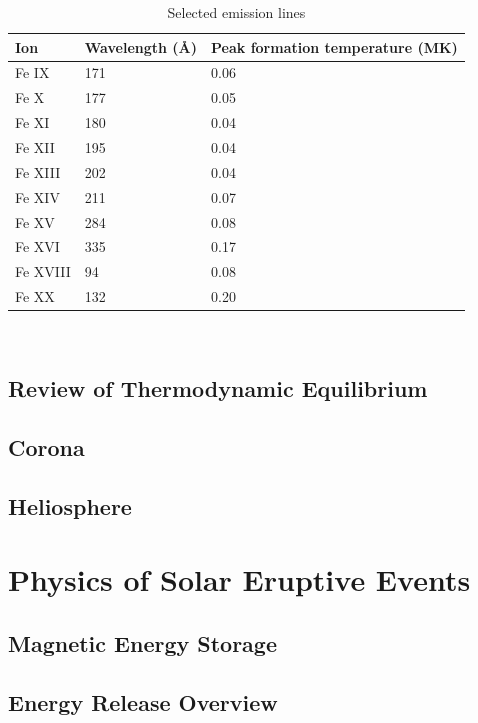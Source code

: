 \begin{table}[!h]
    \caption[Selected emission lines and temperatures]{
    Selected emission lines
    }
    \begin{center}
    \begin{tabular}{|l|l|l|} \hline
	Ion & Wavelength (\AA) & Peak formation temperature (MK) \\ \hline \hline
	Fe IX & 171 & 0.06 \\ \hline
	Fe X & 177 & 0.05  \\ \hline
	Fe XI & 180 & 0.04 \\ \hline
	Fe XII & 195 & 0.04 \\ \hline
	Fe XIII & 202 & 0.04 \\ \hline
	Fe XIV & 211 & 0.07 \\ \hline
	Fe XV & 284 & 0.08 \\ \hline
	Fe XVI & 335 & 0.17 \\ \hline
	Fe XVIII & 94 & 0.08 \\ \hline
	Fe XX & 132 & 0.20 \\ \hline
	\end{tabular}
    \\ \rule{0mm}{5mm}
    \end{center}
    \label{tab:emissionlines}
\end{table}

\subsection{Review of Thermodynamic Equilibrium} 

\subsection{Corona}

\subsection{Heliosphere}

\section{Physics of Solar Eruptive Events}

\subsection{Magnetic Energy Storage}

\subsection{Energy Release Overview}

